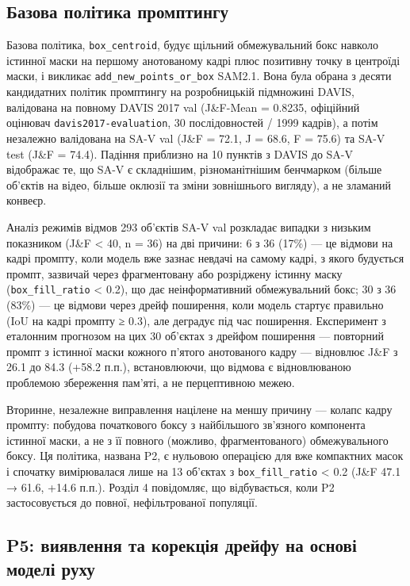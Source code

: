 \documentclass[11pt]{article}
\begin{document}
\subsection{Базова політика промптингу}

Базова політика, \texttt{box\_centroid}, будує щільний обмежувальний бокс навколо істинної маски на першому анотованому кадрі плюс позитивну точку в центроїді маски, і викликає \texttt{add\_new\_points\_or\_box} SAM2.1. Вона була обрана з десяти кандидатних політик промптингу на розробницькій підмножині DAVIS, валідована на повному DAVIS 2017 val (J\&F-Mean = 0.8235, офіційний оцінювач \texttt{davis2017-evaluation}, 30 послідовностей / 1999 кадрів), а потім незалежно валідована на SA-V val (J\&F = 72.1, J = 68.6, F = 75.6) та SA-V test (J\&F = 74.4). Падіння приблизно на 10 пунктів з DAVIS до SA-V відображає те, що SA-V є складнішим, різноманітнішим бенчмарком (більше об'єктів на відео, більше оклюзії та зміни зовнішнього вигляду), а не зламаний конвеєр.

Аналіз режимів відмов 293 об'єктів SA-V val розкладає випадки з низьким показником (J\&F < 40, n = 36) на дві причини: 6 з 36 (17\%) --- це відмови на кадрі промпту, коли модель вже зазнає невдачі на самому кадрі, з якого будується промпт, зазвичай через фрагментовану або розріджену істинну маску (\texttt{box\_fill\_ratio} < 0.2), що дає неінформативний обмежувальний бокс; 30 з 36 (83\%) --- це відмови через дрейф поширення, коли модель стартує правильно (IoU на кадрі промпту ≥ 0.3), але деградує під час поширення. Експеримент з еталонним прогнозом на цих 30 об'єктах з дрейфом поширення --- повторний промпт з істинної маски кожного п'ятого анотованого кадру --- відновлює J\&F з 26.1 до 84.3 (+58.2 п.п.), встановлюючи, що відмова є відновлюваною проблемою збереження пам'яті, а не перцептивною межею.

Вторинне, незалежне виправлення націлене на меншу причину --- колапс кадру промпту: побудова початкового боксу з найбільшого зв'язного компонента істинної маски, а не з її повного (можливо, фрагментованого) обмежувального боксу. Ця політика, названа P2, є нульовою операцією для вже компактних масок і спочатку вимірювалася лише на 13 об'єктах з \texttt{box\_fill\_ratio} < 0.2 (J\&F 47.1 → 61.6, +14.6 п.п.). Розділ 4 повідомляє, що відбувається, коли P2 застосовується до повної, нефільтрованої популяції.

\subsection{P5: виявлення та корекція дрейфу на основі моделі руху}
\end{document}
